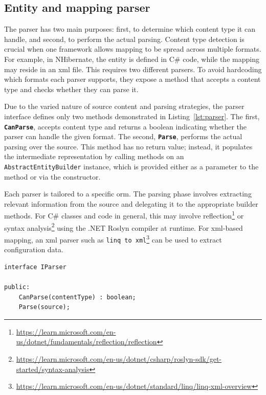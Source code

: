 \subsection{Entity and mapping parser}
The parser has two main purposes: first, to determine which content type it can handle, and second, to perform the actual parsing. Content type detection is crucial when one framework allows mapping to be spread across multiple formats. For example, in NHibernate, the entity is defined in C\# code, while the mapping may reside in an \acrshort{xml} file. This requires two different parsers. To avoid hardcoding which formats each parser supports, they expose a method that accepts a content type and checks whether they can parse it.

Due to the varied nature of source content and parsing strategies, the parser interface defines only two methods demonstrated in Listing~\ref{lst:parser}. The first, \texttt{\textbf{CanParse}}, accepts content type and returns a boolean indicating whether the parser can handle the given format. The second, \texttt{\textbf{Parse}}, performs the actual parsing over the source. This method has no return value; instead, it populates the intermediate representation by calling methods on an \texttt{AbstractEntityBuilder} instance, which is provided either as a parameter to the method or via the constructor.

Each parser is tailored to a specific \acrshort{orm}. The parsing phase involves extracting relevant information from the source and delegating it to the appropriate builder methods. For C\# classes and code in general, this may involve  reflection\footnote{\url{https://learn.microsoft.com/en-us/dotnet/fundamentals/reflection/reflection}} or syntax analysis\footnote{\url{https://learn.microsoft.com/en-us/dotnet/csharp/roslyn-sdk/get-started/syntax-analysis}} using the .NET Roslyn compiler at runtime. For \acrshort{xml}-based mapping, an \acrshort{xml} parser such as \texttt{\acrshort{linq} to \acrshort{xml}}\footnote{\url{https://learn.microsoft.com/en-us/dotnet/standard/linq/linq-xml-overview}} can be used to extract configuration data.

 \begin{lstlisting}[caption={IParser interface structure}, language=pseudo, label={lst:parser}]
interface IParser

public:
    CanParse(contentType) : boolean;
    Parse(source);
 \end{lstlisting}

